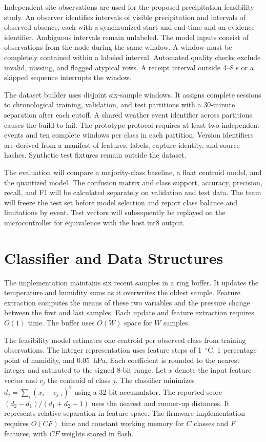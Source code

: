 \documentclass[conference]{IEEEtran}
\begin{document}
Independent site observations are used for the proposed precipitation feasibility study. An observer identifies intervals of visible precipitation and intervals of observed absence, each with a synchronized start and end time and an evidence identifier. Ambiguous intervals remain unlabeled. The model inputs consist of observations from the node during the same window. A window must be completely contained within a labeled interval. Automated quality checks exclude invalid, missing, and flagged atypical rows. A receipt interval outside 4--8 s or a skipped sequence interrupts the window.

The dataset builder uses disjoint six-sample windows. It assigns complete sessions to chronological training, validation, and test partitions with a 30-minute separation after each cutoff. A shared weather event identifier across partitions causes the build to fail. The prototype protocol requires at least two independent events and ten complete windows per class in each partition. Version identifiers are derived from a manifest of features, labels, capture identity, and source hashes. Synthetic test fixtures remain outside the dataset.

The evaluation will compare a majority-class baseline, a float centroid model, and the quantized model. The confusion matrix and class support, accuracy, precision, recall, and F1 will be calculated separately on validation and test data. The team will freeze the test set before model selection and report class balance and limitations by event. Test vectors will subsequently be replayed on the microcontroller for equivalence with the host int8 output.

\section{Classifier and Data Structures}
The implementation maintains six recent samples in a ring buffer. It updates the temperature and humidity sums as it overwrites the oldest sample. Feature extraction computes the means of these two variables and the pressure change between the first and last samples. Each update and feature extraction requires $O(1)$ time. The buffer uses $O(W)$ space for $W$ samples.

The feasibility model estimates one centroid per observed class from training observations. The integer representation uses feature steps of 1~$^{\circ}$C, 1 percentage point of humidity, and 0.05~hPa. Each coefficient is rounded to the nearest integer and saturated to the signed 8-bit range. Let $x$ denote the input feature vector and $c_j$ the centroid of class $j$. The classifier minimizes $d_j=\sum_i (x_i-c_{j,i})^2$ using a 32-bit accumulator. The reported score $(d_2-d_1)/(d_1+d_2+1)$ uses the nearest and runner-up distances. It represents relative separation in feature space. The firmware implementation requires $O(CF)$ time and constant working memory for $C$ classes and $F$ features, with $CF$ weights stored in flash.
\end{document}
